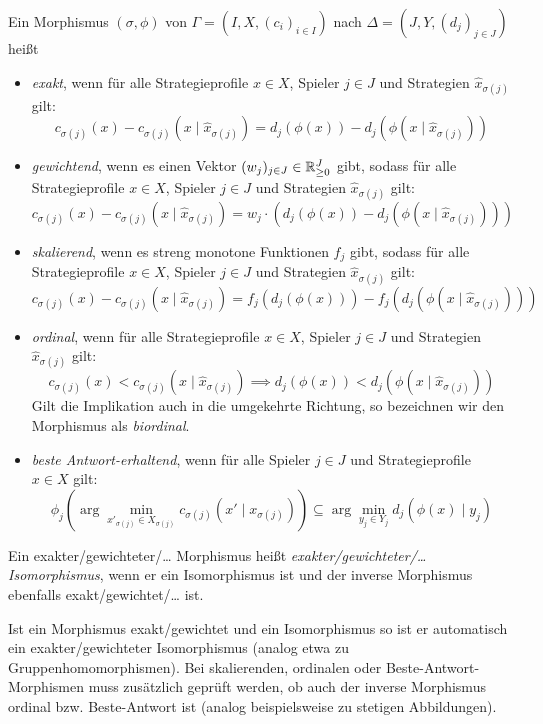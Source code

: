 \begin{defn}\label{def:PotentialMorphismen}
	Ein Morphismus $(\sigma, \phi)$ von $\Gamma = (I, X, (c_i)_{i\in I})$ nach $\Delta = (J, Y, (d_j)_{j\in J})$ heißt
	\begin{itemize}
		\item \emph{exakt}, wenn für alle Strategieprofile $x \in X$, Spieler $j \in J$ und Strategien $\hat{x}_{\sigma(j)}$ gilt:
		\[c_{\sigma(j)}(x) - c_{\sigma(j)}(x \mid \hat{x}_{\sigma(j)}) = d_j(\phi(x)) - d_j(\phi(x \mid \hat{x}_{\sigma(j)}))\]
		\item \emph{gewichtend}, wenn es einen Vektor $(w_j)_{j \in J} \in \mathbb{R}_{\geq 0}^J$ gibt, sodass für alle Strategieprofile $x \in X$, Spieler $j \in J$ und Strategien $\hat{x}_{\sigma(j)}$ gilt:
		\[c_{\sigma(j)}(x) - c_{\sigma(j)}(x \mid \hat{x}_{\sigma(j)}) = w_j\cdot\left(d_j(\phi(x)) - d_j(\phi(x \mid \hat{x}_{\sigma(j)}))\right)\]
		\item \emph{skalierend}, wenn es streng monotone Funktionen $f_j$ gibt, sodass für alle Strategieprofile $x \in X$, Spieler $j \in J$ und Strategien $\hat{x}_{\sigma(j)}$ gilt:
		\[c_{\sigma(j)}(x) - c_{\sigma(j)}(x \mid \hat{x}_{\sigma(j)}) = f_j(d_j(\phi(x))) - f_j(d_j(\phi(x \mid \hat{x}_{\sigma(j)})))\]
		\item \emph{ordinal}, wenn für alle Strategieprofile $x \in X$, Spieler $j \in J$ und Strategien $\hat{x}_{\sigma(j)}$ gilt:
		\[c_{\sigma(j)}(x) < c_{\sigma(j)}(x \mid \hat{x}_{\sigma(j)}) \implies d_j(\phi(x)) < d_j(\phi(x \mid \hat{x}_{\sigma(j)}))\]
		Gilt die Implikation auch in die umgekehrte Richtung, so bezeichnen wir den Morphismus als \emph{biordinal}.
		\item \emph{beste Antwort-erhaltend}, wenn für alle Spieler $j \in J$ und Strategieprofile $x \in X$ gilt:
		\[\phi_j(\arg \min_{x'_{\sigma(j)} \in X_{\sigma(j)}}c_{\sigma(j)}(x' \mid x_{\sigma(j)})) \subseteq \arg \min_{y_j \in Y_j} d_j(\phi(x) \mid y_j)\]
	\end{itemize}	
	Ein exakter/gewichteter/\dots{} Morphismus heißt \emph{exakter/gewichteter/\dots{} Isomorphismus}, wenn er ein Isomorphismus ist und der inverse Morphismus ebenfalls exakt/gewichtet/\dots{} ist.
\end{defn}

\begin{bem}
	Ist ein Morphismus exakt/gewichtet und ein Isomorphismus so ist er automatisch ein exakter/gewichteter Isomorphismus (analog etwa zu Gruppenhomomorphismen). Bei skalierenden, ordinalen oder Beste-Antwort-Morphismen muss zusätzlich geprüft werden, ob auch der inverse Morphismus ordinal bzw. Beste-Antwort ist (analog beispielsweise zu stetigen Abbildungen).
\end{bem}

